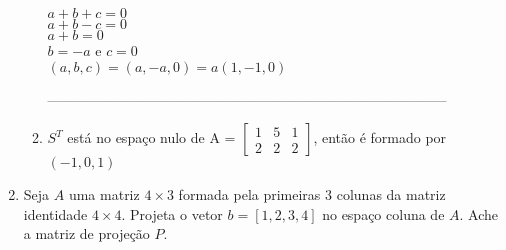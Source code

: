 \documentclass[leqno]{article}
\begin{document}
\begin{enumerate}
\begin{sol}
\begin{enumerate}
			$a + b + c = 0$\\
			$a + b - c = 0$\\
			$a + b = 0$\\
			$b = -a$ e $c = 0$\\
			$(a, b, c) = (a, -a, 0) = a(1, -1, 0)$
			
			--------------------------------------------------------------------------------------								  
				\item $S^T$ está no espaço nulo de A = $\begin{bmatrix}
					1 & 5 & 1 \\
					2 & 2 & 2
				\end{bmatrix}$, então é formado por $(-1, 0, 1)$
			\end{enumerate}    
		\end{sol} 
		
		\item Seja $A$ uma matriz $4 \times 3$ formada pela primeiras 3 colunas da matriz identidade $4 \times 4$. Projeta o vetor $b = [1,2,3,4]$ no espaço coluna de $A$. Ache a matriz de projeção $P$.
		

\end{enumerate}
\end{document}
